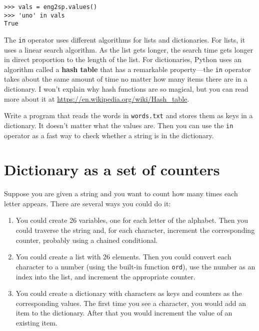 
\beforeverb
\begin{verbatim}
>>> vals = eng2sp.values()
>>> 'uno' in vals
True
\end{verbatim}
\afterverb
%
The {\tt in} operator uses different algorithms for lists and
dictionaries.  For lists, it uses a linear search algorithm.
As the list gets longer, the search time gets
longer in direct proportion to the length of the list.  
For dictionaries, Python uses an
algorithm called a {\bf hash table} that has a remarkable property---the
{\tt in} operator takes about the same amount of time no matter how
many items there are in a dictionary.  I won't explain 
why hash functions are so magical,
but you can read more about it at
\url{https://en.wikipedia.org/wiki/Hash_table}.


\begin{ex}
\label{wordlist2}


Write a program that reads the words in {\tt words.txt} and
stores them as keys in a dictionary.  It doesn't matter what the
values are.  Then you can use the {\tt in} operator
as a fast way to check whether a string is in
the dictionary.

\end{ex}


\section{Dictionary as a set of counters}
\label{histogram}


Suppose you are given a string and you want to count how many
times each letter appears.  There are several ways you could do it:

\begin{enumerate}

\item You could create 26 variables, one for each letter of the
alphabet.  Then you could traverse the string and, for each
character, increment the corresponding counter, probably using
a chained conditional.

\item You could create a list with 26 elements.  Then you could
convert each character to a number (using the built-in function
{\tt ord}), use the number as an index into the list, and increment
the appropriate counter.

\item You could create a dictionary with characters as keys
and counters as the corresponding values.  The first time you
see a character, you would add an item to the dictionary.  After
that you would increment the value of an existing item.

\end{enumerate}

